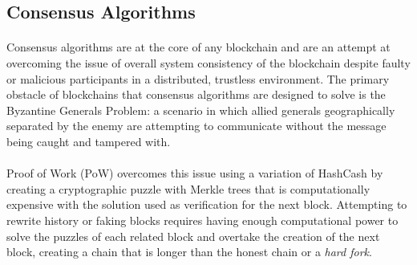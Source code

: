 
\subsection{Consensus Algorithms}


\paragraph{} Consensus algorithms are at the core of any blockchain and are an attempt at overcoming the issue of overall system consistency of the blockchain despite faulty or malicious participants in a distributed, trustless environment. The primary obstacle of blockchains that consensus algorithms are designed to solve is the Byzantine Generals Problem:  a scenario in which allied generals geographically separated by the enemy are attempting to communicate without the message being caught and tampered with. 

\paragraph{} Proof of Work (PoW) overcomes this issue using a variation of HashCash \cite{back2002} by creating a cryptographic puzzle with Merkle trees  that is computationally expensive with the solution used as verification for the next block. Attempting to rewrite history or faking blocks requires having enough computational power to solve the puzzles of each related block and overtake the creation of the next block, creating a chain that is longer than the honest chain or a \textit{hard fork}.


